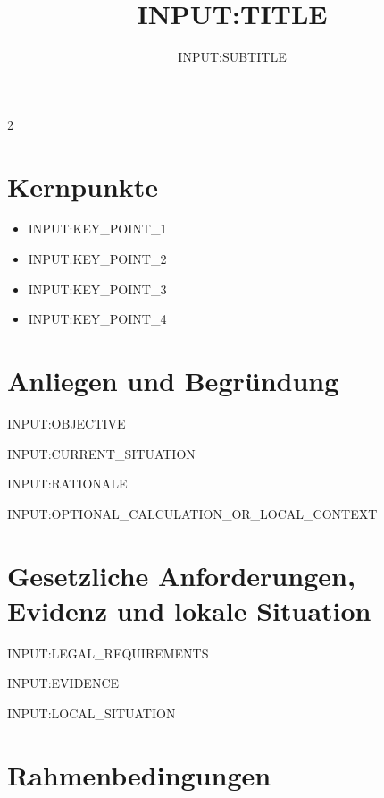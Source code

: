 \documentclass[a4paper]{article}
\title{{{INPUT:TITLE}}}
\subtitle{{{INPUT:SUBTITLE}}}
\date{\todaydeutsch}
\begin{document}
\maketitle
\enlargethispage{0.3cm}

\thispagestyle{fancy}
\hypertarget{toc}{}

\tableofcontents

\hypersetup{
  linkcolor = red!70!black,
  citecolor = black,
  urlcolor = blue
}

\raggedcolumns
\begin{multicols}{2}

\section{Kernpunkte}
\label{sec:Kernpunkte}

\begin{itemize}
  \item[-] {{INPUT:KEY_POINT_1}}
  \item[-] {{INPUT:KEY_POINT_2}}
  \item[-] {{INPUT:KEY_POINT_3}}
  \item[-] {{INPUT:KEY_POINT_4}}
\end{itemize}

\section{Anliegen und Begründung}
\label{sec:Anliegen und Begründung}

{{INPUT:OBJECTIVE}}

{{INPUT:CURRENT_SITUATION}}

{{INPUT:RATIONALE}}

{{INPUT:OPTIONAL_CALCULATION_OR_LOCAL_CONTEXT}}

\section{Gesetzliche Anforderungen, Evidenz und lokale Situation}
\label{sec:Gesetzliche Anforderungen, Evidenz und lokale Situation}

{{INPUT:LEGAL_REQUIREMENTS}}

{{INPUT:EVIDENCE}}

{{INPUT:LOCAL_SITUATION}}

\section{Rahmenbedingungen}
\label{sec:Rahmenbedingungen}


\end{multicols}
\end{document}
